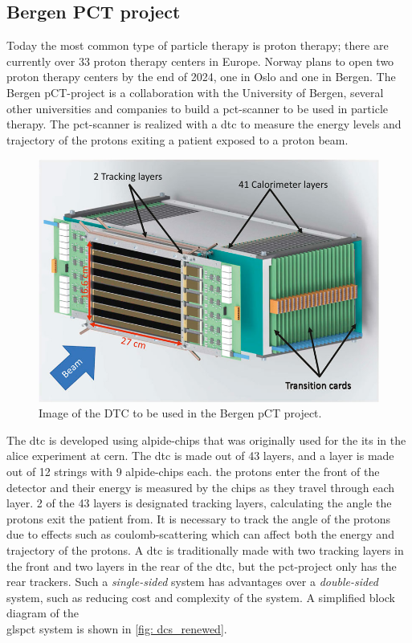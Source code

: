 \documentclass[main.tex]{subfiles}
\begin{document}
\subsection{Bergen PCT project}
Today the most common type of particle therapy is proton therapy; there are currently over 33 proton therapy centers in Europe. Norway plans to open two proton therapy centers by the end of 2024, one in Oslo and one in Bergen. The Bergen pCT-project is a collaboration with the University of Bergen, several other universities and companies to build a \gls{pct}-scanner to be used in particle therapy. The \gls{pct}-scanner is realized with a \gls{dtc} to measure the energy levels and trajectory of the protons exiting a patient exposed to a proton beam.

\begin{figure}[!ht]
    \centering
    \includegraphics[scale = 0.5]{images/dtc.jpg}
    \caption{Image of the DTC to be used in the Bergen pCT project.}
    \label{fig: rt_intro}
\end{figure}
\FloatBarrier

The \gls{dtc} is developed using \gls{alpide}-chips that was originally used for the \gls{its} in the \acrshort{alice} experiment at \acrshort{cern}. The \gls{dtc} is made out of 43 layers, and a layer is made out of 12 strings with 9 \gls{alpide}-chips each. the protons enter the front of the detector and their energy is measured by the chips as they travel through each layer. 2 of the 43 layers is designated tracking layers, calculating the angle the protons exit the patient from. It is necessary to track the angle of the protons due to effects such as coulomb-scattering which can affect both the energy and trajectory of the protons. A \gls{dtc} is traditionally made with two tracking layers in the front and two layers in the rear of the \gls{dtc}, but the \gls{pct}-project only has the rear trackers. Such a \textit{single-sided} system has advantages over a \textit{double-sided} system, such as reducing cost and complexity of the system. A simplified block diagram of the \\gls{pct} system is shown in \autoref{fig: dcs_renewed}.
\end{document}

